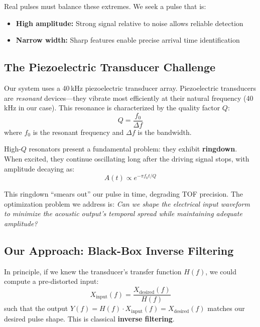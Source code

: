 \documentclass[11pt]{article}
\begin{document}
Real pulses must balance these extremes. We seek a pulse that is:
\begin{itemize}
    \item \textbf{High amplitude:} Strong signal relative to noise allows reliable detection
    \item \textbf{Narrow width:} Sharp features enable precise arrival time identification
\end{itemize}

\subsection{The Piezoelectric Transducer Challenge}

Our system uses a 40\,kHz piezoelectric transducer array. Piezoelectric transducers are \textit{resonant} devices---they vibrate most efficiently at their natural frequency (40\,kHz in our case). This resonance is characterized by the quality factor $Q$:
\begin{equation}
    Q = \frac{f_0}{\Delta f}
\end{equation}
where $f_0$ is the resonant frequency and $\Delta f$ is the bandwidth.

High-$Q$ resonators present a fundamental problem: they exhibit \textbf{ringdown}. When excited, they continue oscillating long after the driving signal stops, with amplitude decaying as:
\begin{equation}
    A(t) \propto e^{-\pi f_0 t / Q}
\end{equation}

This ringdown ``smears out'' our pulse in time, degrading TOF precision. The optimization problem we address is: \textit{Can we shape the electrical input waveform to minimize the acoustic output's temporal spread while maintaining adequate amplitude?}

\subsection{Our Approach: Black-Box Inverse Filtering}

In principle, if we knew the transducer's transfer function $H(f)$, we could compute a pre-distorted input:
\begin{equation}
    X_{\text{input}}(f) = \frac{X_{\text{desired}}(f)}{H(f)}
\end{equation}
such that the output $Y(f) = H(f) \cdot X_{\text{input}}(f) = X_{\text{desired}}(f)$ matches our desired pulse shape. This is classical \textbf{inverse filtering}.
\end{document}
